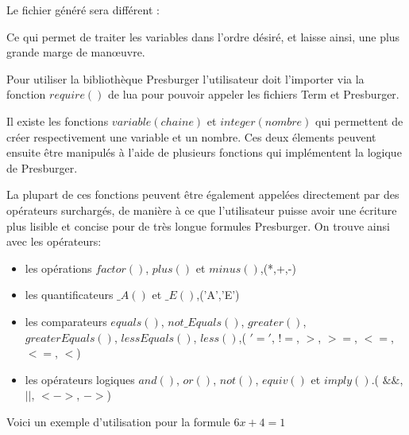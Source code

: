 Le fichier généré sera différent : \vspace{0.5cm}


Ce qui permet de traiter les variables dans l'ordre désiré, et laisse ainsi, une plus grande marge de man\oe{}uvre.\\\par

Pour utiliser la bibliothèque Presburger l'utilisateur doit l'importer via la fonction $require()$ de lua pour pouvoir appeler les fichiers Term et Presburger.\\\par

Il existe les fonctions $variable(chaine)$ et $integer(nombre)$ qui permettent de créer respectivement une variable et un nombre. Ces deux élements peuvent ensuite être manipulés à l'aide de plusieurs fonctions qui implémentent la logique de Presburger.\\\par

La plupart de ces fonctions peuvent être également appelées directement par des opérateurs surchargés, de manière à ce que l'utilisateur puisse avoir une écriture plus lisible et concise pour de très longue formules Presburger. On trouve ainsi avec les opérateurs:
\begin{itemize}
 \item les opérations $factor()$, $plus()$ et $minus()$,(*,+,-)
 \item les quantificateurs $\_A()$ et $\_E()$,('A','E')
 \item les comparateurs $equals()$, $not\_Equals()$, $greater()$,\\$greaterEquals()$, $lessEquals()$, $less()$,( $'='$, $!=$, $>$, $>=$, $<=$, $<=$, $<$)
 \item les opérateurs logiques $and()$, $or()$, $not()$, $equiv()$ et $imply()$.( $\&\&$, $||$, $<->$, $->$)
\end{itemize}
Voici un exemple d'utilisation pour la formule $6x + 4 = 1$\\
 
